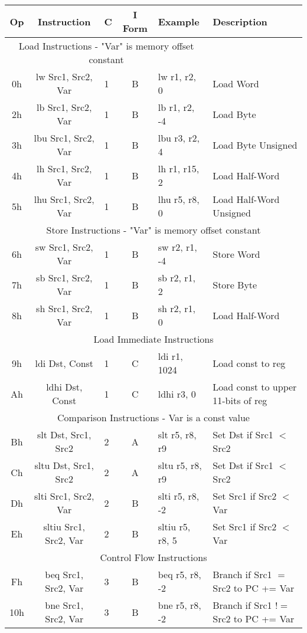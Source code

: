 \documentclass[]{article}
\begin{document}
\begin{longtable}{|c|c|l|c|l|p{5cm}|}
	\hline
	Op & Instruction & C & I Form & Example & Description \\
	\hline
	\multicolumn{5}{|c|}{Load Instructions - "Var" is memory offset constant} \\
	\hline
	0h & lw Src1, Src2, Var & 1 & B & lw r1, r2, 0 & Load Word \\
	\hline
	2h & lb Src1, Src2, Var & 1 & B & lb r1, r2, -4 & Load Byte\\
	\hline
	3h & lbu Src1, Src2, Var & 1 & B & lbu r3, r2, 4 & Load Byte Unsigned \\
	\hline
	4h & lh Src1, Src2, Var & 1 & B & lh r1, r15, 2 & Load Half-Word \\
	\hline
	5h & lhu Src1, Src2, Var & 1 & B & lhu r5, r8, 0 & Load Half-Word Unsigned \\
	\hline
	\multicolumn{6}{|c|}{Store Instructions - "Var" is memory offset constant} \\
	\hline
	6h & sw Src1, Src2, Var & 1 & B & sw r2, r1, -4 & Store Word \\
	\hline
	7h & sb Src1, Src2, Var & 1 & B & sb r2, r1, 2 & Store Byte \\
	\hline
	8h & sh Src1, Src2, Var & 1 & B & sh r2, r1, 0 & Load Half-Word \\
	\hline
	\multicolumn{6}{|c|}{Load Immediate Instructions} \\
	\hline
	9h & ldi Dst, Const & 1 & C & ldi r1, 1024 & Load const to reg \\
	\hline
	Ah & ldhi Dst, Const & 1 & C & ldhi r3, 0 & Load const to upper 11-bits of reg \\
	\hline
	\multicolumn{6}{|c|}{Comparison Instructions - Var is a const value} \\
	\hline
	Bh & slt Dst, Src1, Src2 & 2 & A & slt r5, r8, r9 & Set Dst if Src1 $<$ Src2 \\
	\hline
	Ch & sltu Dst, Src1, Src2 & 2 & A & sltu r5, r8, r9 & Set Dst if Src1 $<$ Src2 \\
	\hline
	Dh & slti Src1, Src2, Var & 2 & B & slti r5, r8, -2 & Set Src1 if Src2 $<$ Var \\
	\hline
	Eh & sltiu Src1, Src2, Var & 2 & B & sltiu r5, r8, 5 & Set Src1 if Src2 $<$ Var \\
	\multicolumn{6}{|c|}{Control Flow Instructions} \\
	\hline
	Fh & beq Src1, Src2, Var & 3 & B & beq r5, r8, -2 & Branch if Src1 $=$ Src2 to PC += Var \\
	\hline
	10h & bne Src1, Src2, Var & 3 & B & bne r5, r8, -2 & Branch if Src1 $!=$ Src2 to PC += Var \\

\end{longtable}
\end{document}
